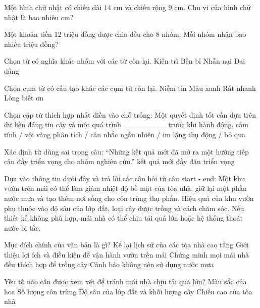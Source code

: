 \begin{ex}
Một hình chữ nhật có chiều dài $14$ cm và chiều rộng $9$ cm. Chu vi của hình chữ nhật là bao nhiêu cm?
\end{ex}

\begin{ex}
Một khoản tiền $12$ triệu đồng được chia đều cho $8$ nhóm. Mỗi nhóm nhận bao nhiêu triệu đồng?
\end{ex}

\begin{ex}
Chọn từ có nghĩa khác nhóm với các từ còn lại.
\choice
{\True Kiên trì}
{Bền bỉ}
{Nhẫn nại}
{Dai dẳng}
\end{ex}

\begin{ex}
Chọn cụm từ có cấu tạo khác các cụm từ còn lại.
\choice
{Niềm tin}
{Màu xanh}
{\True Rất nhanh}
{Lòng biết ơn}
\end{ex}

\begin{ex}
Chọn cặp từ thích hợp nhất điền vào chỗ trống: Một quyết định tốt cần dựa trên dữ liệu đáng tin cậy và một quá trình ________ trước khi hành động.
\choice
{cảm tính / vội vàng}
{\True phân tích / cân nhắc}
{ngẫu nhiên / im lặng}
{thụ động / bỏ qua}
\end{ex}

\begin{ex}
Xác định từ dùng sai trong câu: “Những kết quả mới đã mở ra một hướng tiếp cận đầy triển vọng cho nhóm nghiên cứu.”
\choice
{kết quả}
{mới}
{\True đầy đặn}
{triển vọng}
\end{ex}

\begin{baidoc}
\item[] Dựa vào thông tin dưới đây và trả lời các câu hỏi từ câu {start} - {end}:
Một khu vườn trên mái có thể làm giảm nhiệt độ bề mặt của tòa nhà, giữ lại một phần nước mưa và tạo thêm nơi sống cho côn trùng thụ phấn. Hiệu quả của khu vườn phụ thuộc vào độ sâu của lớp đất, loại cây được trồng và cách chăm sóc. Nếu thiết kế không phù hợp, mái nhà có thể chịu tải quá lớn hoặc hệ thống thoát nước bị tắc.
\begin{ex}
Mục đích chính của văn bản là gì?
\choice
{Kể lại lịch sử của các tòa nhà cao tầng}
{\True Giới thiệu lợi ích và điều kiện để vận hành vườn trên mái}
{Chứng minh mọi mái nhà đều thích hợp để trồng cây}
{Cảnh báo không nên sử dụng nước mưa}
\end{ex}
\begin{ex}
Yếu tố nào cần được xem xét để tránh mái nhà chịu tải quá lớn?
\choice
{Màu sắc của hoa}
{Số lượng côn trùng}
{\True Độ sâu của lớp đất và khối lượng cây}
{Chiều cao của tòa nhà}
\end{ex}
\end{baidoc}

